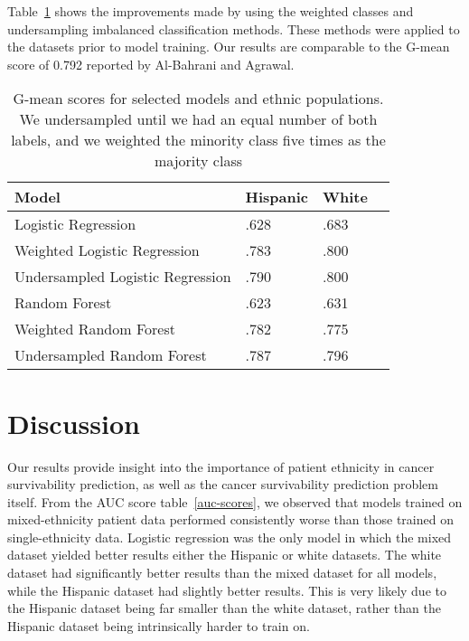 \documentclass[review]{elsarticle}
\begin{document}
Table~\ref{gmean-compare} shows the improvements made by using the weighted classes and undersampling imbalanced classification methods. These methods were applied to the datasets prior to model training. Our results are comparable to the G-mean score of 0.792 reported by Al-Bahrani and Agrawal\cite{al2017survivability}.
\begin{table}[H]
	\caption{G-mean scores for selected models and ethnic populations. We undersampled until we had an equal number of both labels, and we weighted the minority class five times as the majority class}
	\centering
	\begin{tabular}{llll}
		\textbf{Model}               & \textbf{Hispanic} & \textbf{White} &   \\ \hline
		Logistic Regression          & .628              & .683           &   \\
		Weighted Logistic Regression & .783              & .800             &   \\
		Undersampled Logistic Regression & .790 & .800 & \\ 
		Random Forest                & .623              & .631           &   \\
		Weighted Random Forest       & .782              & .775           &  \\
		Undersampled Random Forest & .787 & .796
		
	\end{tabular}
	
	
	\label{gmean-compare}
\end{table}

\section{Discussion}
Our results provide insight into the importance of patient ethnicity in cancer survivability prediction, as well as the cancer survivability prediction problem itself. From the AUC score table~\ref{auc-scores}, we observed that models trained on mixed-ethnicity patient data performed consistently worse than those trained on single-ethnicity data. Logistic regression was the only model in which the mixed dataset yielded better results either the Hispanic or white datasets. The white dataset had significantly better results than the mixed dataset for all models, while the Hispanic dataset had slightly better results. This is very likely due to the Hispanic dataset being far smaller than the white dataset, rather than the Hispanic dataset being intrinsically harder to train on. 
\end{document}
